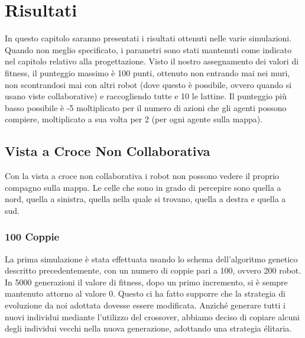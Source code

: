 \chapter{Risultati}
In questo capitolo saranno presentati i risultati ottenuti nelle varie
simulazioni. Quando non meglio specificato, i parametri sono stati mantenuti
come indicato nel capitolo relativo alla progettazione.\newline
Visto il nostro assegnamento dei valori di fitness, il punteggio massimo è 100
punti, ottenuto non entrando mai nei muri, non scontrandosi mai con altri robot
(dove questo è possibile, ovvero quando si usano viste collaborative) e
raccogliendo tutte e 10 le lattine. Il punteggio più basso possibile è -5
moltiplicato per il numero di azioni che gli agenti possono compiere,
moltiplicato a sua volta per 2 (per ogni agente sulla mappa).



\section{Vista a Croce Non Collaborativa}
Con la vista a croce non collaborativa i robot non possono vedere il proprio
compagno sulla mappa. Le celle che sono in grado di percepire sono quella a
nord, quella a sinistra, quella nella quale si trovano, quella a destra e quella
a sud.

\subsection{100 Coppie}
La prima simulazione è stata effettuata usando lo schema dell'algoritmo genetico
descritto precedentemente, con un numero di coppie pari a 100, ovvero 200
robot.\newline
In 5000 generazioni il valore di fitness, dopo un primo incremento, si è sempre
mantenuto attorno al valore 0. Questo ci ha fatto supporre che la strategia di
evoluzione da noi adottata dovesse essere modificata. Anziché generare tutti i
nuovi individui mediante l'utilizzo del crossover, abbiamo deciso di copiare
alcuni degli individui vecchi nella nuova generazione, adottando una strategia
élitaria.

